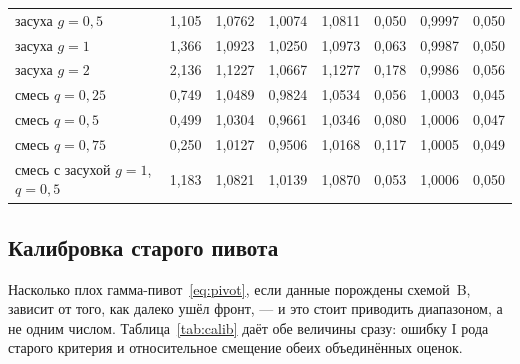 \documentclass[11pt,a4paper]{article}
\theoremstyle{plain}
\theoremstyle{remark}
\begin{document}
\begin{table}[t]
\begin{tabular}{lrrrrrrr}
засуха $g=0{,}5$ & 1{,}105 & 1{,}0762 & 1{,}0074 & 1{,}0811 & 0{,}050 & 0{,}9997 & 0{,}050\\
засуха $g=1$ & 1{,}366 & 1{,}0923 & 1{,}0250 & 1{,}0973 & 0{,}063 & 0{,}9987 & 0{,}050\\
засуха $g=2$ & 2{,}136 & 1{,}1227 & 1{,}0667 & 1{,}1277 & 0{,}178 & 0{,}9986 & 0{,}056\\
\midrule
смесь $q=0{,}25$ & 0{,}749 & 1{,}0489 & 0{,}9824 & 1{,}0534 & 0{,}056 & 1{,}0003 & 0{,}045\\
смесь $q=0{,}5$ & 0{,}499 & 1{,}0304 & 0{,}9661 & 1{,}0346 & 0{,}080 & 1{,}0006 & 0{,}047\\
смесь $q=0{,}75$ & 0{,}250 & 1{,}0127 & 0{,}9506 & 1{,}0168 & 0{,}117 & 1{,}0005 & 0{,}049\\
смесь с засухой $g=1$, $q=0{,}5$ & 1{,}183 & 1{,}0821 & 1{,}0139 & 1{,}0870 & 0{,}053 & 1{,}0006 & 0{,}050\\
\bottomrule
\end{tabular}
\end{table}

\subsection{Калибровка старого пивота}\label{sec:calib}

Насколько плох гамма-пивот~\eqref{eq:pivot}, если данные порождены схемой~B,
зависит от того, как далеко ушёл фронт, --- и это стоит приводить диапазоном, а
не одним числом. Таблица~\ref{tab:calib} даёт обе величины сразу: ошибку I рода
старого критерия и относительное смещение обеих объединённых оценок.
\end{document}
